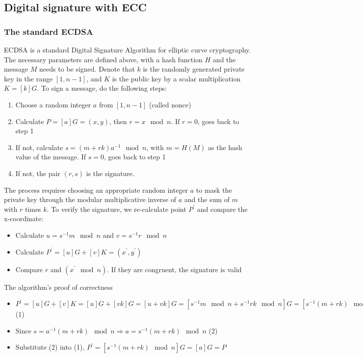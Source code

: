 \subsection{Digital signature with ECC}

\subsubsection{The standard ECDSA}
ECDSA is a standard Digital Signature Algorithm for elliptic curve cryptography. The necessary parameters are defined above, with a hash function $H$ and the message $M$ needs to be signed. Denote that $k$ is the randomly generated private key in the range  $[1, n - 1]$, and $K$ is the public key by a scalar multiplication $K =[k]G$. To sign a message, do the following steps:

\begin{enumerate}
  \item Choose a random integer $a$ from $[1, n - 1]$ (called nonce)
  \item Calculate $P = [a]G = (x, y)$, then $r = x \mod n$. If $r = 0$, goes back to step 1
  \item If not, calculate $s=(m+rk) a^{-1} \mod n$, with $m = H(M)$ as the hash value of the message. If $s = 0$, goes back to step 1
  \item If not, the pair $(r, s)$ is the signature.
\end{enumerate}

The process requires choosing an appropriate random integer $a$ to mask the private key through the modular multiplicative inverse of $a$ and the sum of $m$ with $r$ times $k$. To verify the signature, we re-calculate point $P^\prime$ and compare the x-coordinate:

\begin{itemize}
  \item Calculate $u = s^{-1} m \mod n$ and $v = s^{-1} r \mod n$
  \item Calculate $P^\prime = [u]G + [v]K = (x^\prime, y^\prime)$
  \item Compare $r$ and $(x^\prime \mod n)$. If they are congruent, the signature is valid
\end{itemize}

The algorithm’s proof of correctness

\begin{itemize}
  \item $P^\prime = [u]G + [v]K = [u]G + [vk]G = [u +vk]G = [s^{-1}m \mod n + s^{-1}rk \mod n]G = [s^{-1}(m + rk) \mod n]G$ (1)
  \item Since $s = a^{-1}(m+rk) \mod n \Rightarrow a = s^{-1}(m+rk) \mod n$ (2)
  \item Substitute (2) into (1), $P^\prime = [s^{-1}(m + rk) \mod n]G = [a]G = P$
\end{itemize}

